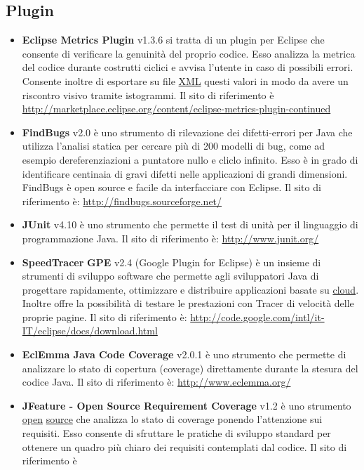 \documentclass[a4paper,11pt]{article}
\begin{document}
\subsection{Plugin}
\begin{itemize}
\item \textbf{Eclipse Metrics Plugin} v1.3.6 si tratta di un plugin per Eclipse che consente di verificare la genuinit\`a del proprio codice. Esso analizza la metrica del codice durante costrutti ciclici e avvisa l'utente in caso di possibili errori. Consente inoltre di esportare su file \underline{XML} questi valori in modo da avere un riscontro visivo tramite istogrammi. Il sito di riferimento \`e \url{http://marketplace.eclipse.org/content/eclipse-metrics-plugin-continued}
\item \textbf{FindBugs} v2.0 \`e uno strumento di rilevazione dei difetti-errori per Java che utilizza l'analisi statica per cercare pi\`u di 200 modelli di bug, come ad esempio dereferenziazioni a puntatore nullo e cliclo infinito. Esso \`e in grado di identificare centinaia di gravi difetti nelle applicazioni di grandi dimensioni. FindBugs \`e open source e facile da interfacciare con Eclipse. Il sito di riferimento \`e:
\url{http://findbugs.sourceforge.net/}
\item \textbf{JUnit} v4.10 \`e uno strumento che permette il test di unit\`a per il linguaggio di programmazione Java. Il sito di riferimento \`e: 
\url{http://www.junit.org/}
\item \textbf{SpeedTracer} \textbf{GPE} v2.4 (Google Plugin for Eclipse) \`e un insieme di strumenti di sviluppo software che permette agli sviluppatori Java di progettare rapidamente, ottimizzare e distribuire applicazioni basate su \underline{cloud}. Inoltre offre la possibilit\`a di testare le prestazioni con Tracer di velocit\`a delle proprie pagine. Il sito di riferimento \`e:
\url{http://code.google.com/intl/it-IT/eclipse/docs/download.html}  
\item \textbf{EclEmma Java Code Coverage} v2.0.1 \`e uno strumento che permette di analizzare lo stato di copertura (coverage) direttamente durante la stesura del codice Java. Il sito di riferimento \`e:
\url{http://www.eclemma.org/}
\item \textbf{JFeature - Open Source Requirement Coverage} v1.2 \`e uno strumento \underline{open} \underline{source} che analizza lo stato di coverage ponendo l'attenzione sui requisiti. Esso consente di sfruttare le pratiche di sviluppo standard per ottenere un quadro pi\`u chiaro dei requisiti contemplati dal codice. Il sito di riferimento \`e

\end{itemize}
\end{document}

